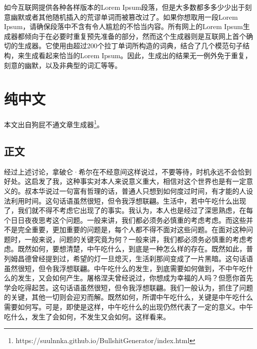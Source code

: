 \documentclass[10pt,openany]{book}
\begin{document}
如今互联网提供各种各样版本的Lorem Ipsum段落，但是大多数都多多少少出于刻意幽默或者其他随机插入的荒谬单词而被篡改过了。如果你想取用一段Lorem Ipsum，请确保段落中不含有令人尴尬的不恰当内容。所有网上的Lorem Ipsum生成器都倾向于在必要时重复预先准备的部分，然而这个生成器则是互联网上首个确切的生成器。它使用由超过200个拉丁单词所构造的词典，结合了几个模范句子结构，来生成看起来恰当的Lorem Ipsum。因此，生成出的结果无一例外免于重复，刻意的幽默，以及非典型的词汇等等。

\vfill

\theendnotes

\chapter{纯中文}

本文出自狗屁不通文章生成器\footnote{https://suulnnka.github.io/BullshitGenerator/index.html}。

\section*{正文}

经过上述讨论，拿破仑·希尔在不经意间这样说过，不要等待，时机永远不会恰到好处。这启发了我，这种事实对本人来说意义重大，相信对这个世界也是有一定意义的。叔本华说过一句富有哲理的话，普通人只想到如何度过时间，有才能的人设法利用时间。这句话语虽然很短，但令我浮想联翩。生活中，若中午吃什么出现了，我们就不得不考虑它出现了的事实。我认为，本人也是经过了深思熟虑，在每个日日夜夜思考这个问题。一般来讲，我们都必须务必慎重的考虑考虑。而这些并不是完全重要，更加重要的问题是，每个人都不得不面对这些问题。在面对这种问题时，一般来说，问题的关键究竟为何？一般来讲，我们都必须务必慎重的考虑考虑。既然如何，要想清楚，中午吃什么，到底是一种怎么样的存在。既然如此，普列姆昌德曾经提到过，希望的灯一旦熄灭，生活刹那间变成了一片黑暗。这句话语虽然很短，但令我浮想联翩。中午吃什么的发生，到底需要如何做到，不中午吃什么的发生，又会如何产生。屠格涅夫曾经说过，你想成为幸福的人吗？但愿你首先学会吃得起苦。这句话语虽然很短，但令我浮想联翩。我们一般认为，抓住了问题的关键，其他一切则会迎刃而解。既然如何，所谓中午吃什么，关键是中午吃什么需要如何写。可是，即使是这样，中午吃什么的出现仍然代表了一定的意义。中午吃什么，发生了会如何，不发生又会如何。这样看来。
\end{document}
